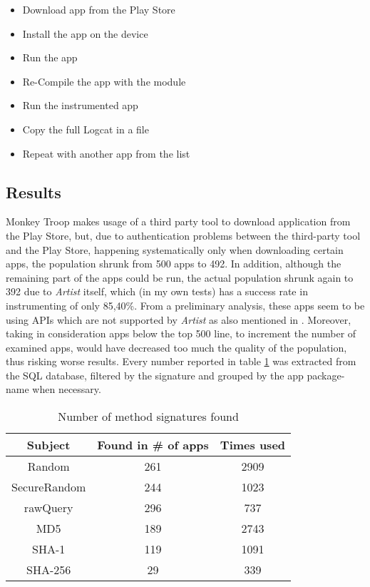 \begin{itemize}
	\item{Download app from the Play Store}
	\item{Install the app on the device}
	\item{Run the app}
	\item{Re-Compile the app with the module}
	\item{Run the instrumented app}
	\item{Copy the full Logcat in a file}
	\item{Repeat with another app from the list}
\end{itemize}

\subsection{Results}
Monkey Troop makes usage of a third party tool to download application from the Play Store, but, due to authentication problems between the third-party tool and the Play Store, happening systematically only when downloading certain apps, the population shrunk from 500 apps to 492.  In addition, although the remaining part of the apps could be run, the actual population shrunk again to 392 due to \emph{Artist} itself, which (in my own tests) has a success rate in instrumenting of only 85,40\%. From a preliminary analysis, these apps seem to be using APIs which are not supported by \emph{Artist} as also mentioned in \cite{artist}. Moreover, taking in consideration apps below the top 500 line, to increment the number of examined apps, would have decreased too much the quality of the population, thus risking worse results. Every number reported in table \ref{tb:respreliminary} was extracted from the SQL database, filtered by the signature and grouped by the app package-name when necessary.

\begin{table}[H]
	\vspace{1.5cm}
	\centering
	\begin{tabular}{|c|c|c|}
		\hline
		Subject & Found in \# of apps  & Times used \\
		\hline
		Random & 261 & 2909 \\
		\hline
		SecureRandom & 244 & 1023\\
		\hline
		rawQuery & 296 & 737\\
		\hline
		MD5 & 189 & 2743\\
		\hline
		SHA-1 & 119 & 1091\\
		\hline
		SHA-256 & 29 & 339\\
		\hline
	\end{tabular}
	\caption{Number of method signatures found}
	\label{tb:respreliminary}
	\vspace{1.5cm}
\end{table}

